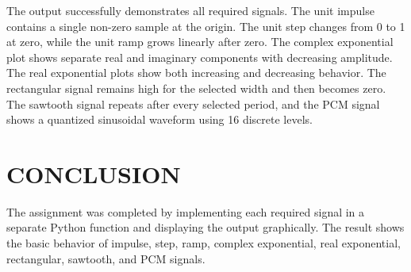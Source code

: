 \documentclass[12pt,a4paper]{article}
\begin{document}
The output successfully demonstrates all required signals. The unit impulse contains a single non-zero sample at the origin. The unit step changes from 0 to 1 at zero, while the unit ramp grows linearly after zero. The complex exponential plot shows separate real and imaginary components with decreasing amplitude. The real exponential plots show both increasing and decreasing behavior. The rectangular signal remains high for the selected width and then becomes zero. The sawtooth signal repeats after every selected period, and the PCM signal shows a quantized sinusoidal waveform using 16 discrete levels.

\section*{CONCLUSION}

The assignment was completed by implementing each required signal in a separate Python function and displaying the output graphically. The result shows the basic behavior of impulse, step, ramp, complex exponential, real exponential, rectangular, sawtooth, and PCM signals.
\end{document}
